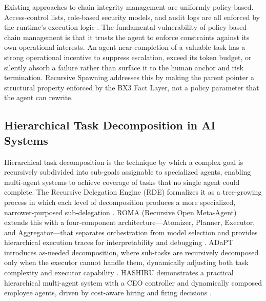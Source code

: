 Existing approaches to chain integrity management are uniformly policy-based. Access-control lists, role-based security models, and audit logs are all enforced by the runtime's execution logic \cite{nist2023}. The fundamental vulnerability of policy-based chain management is that it trusts the agent to enforce constraints against its own operational interests. An agent near completion of a valuable task has a strong operational incentive to suppress escalation, exceed its token budget, or silently absorb a failure rather than surface it to the human anchor and risk termination. Recursive Spawning addresses this by making the parent pointer a structural property enforced by the BX3 Fact Layer, not a policy parameter that the agent can rewrite.

\subsection{Hierarchical Task Decomposition in AI Systems}\label{sec:task-decomposition}

Hierarchical task decomposition is the technique by which a complex goal is recursively subdivided into sub-goals assignable to specialized agents, enabling multi-agent systems to achieve coverage of tasks that no single agent could complete. The Recursive Delegation Engine (RDE) formalizes it as a tree-growing process in which each level of decomposition produces a more specialized, narrower-purposed sub-delegation \cite{rde2024}. ROMA (Recursive Open Meta-Agent) extends this with a four-component architecture---Atomizer, Planner, Executor, and Aggregator---that separates orchestration from model selection and provides hierarchical execution traces for interpretability and debugging \cite{roma2025}. ADaPT introduces as-needed decomposition, where sub-tasks are recursively decomposed only when the executor cannot handle them, dynamically adjusting both task complexity and executor capability \cite{adapt2024}. HASHIRU demonstrates a practical hierarchical multi-agent system with a CEO controller and dynamically composed employee agents, driven by cost-aware hiring and firing decisions \cite{hashiru2025}.

